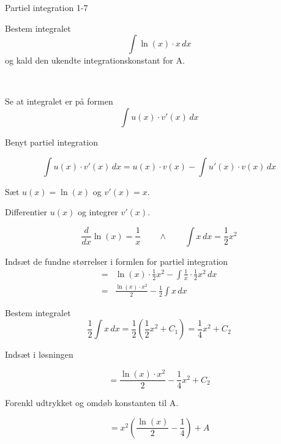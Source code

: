 \documentclass{article}
\begin{document}
\begin{exercise}{Partiel integration 1-7}
	
	
	Bestem integralet
	\[
	\int \ln(x) \cdot x \, dx
	\]
	og kald den ukendte integrationskonstant for A.
	
	 \\
	
	
	\hint
	
	Se at integralet er på formen
	\[
	\int u(x) \cdot v'(x) \, dx
	\]
	
	\hint
	
	Benyt partiel integration
	
	\hint
	\[
	\int u(x) \cdot v'(x)\, dx = u(x) \cdot v(x) - \int u'(x) \cdot v(x) \, dx
	\]
	\hint
	
	Sæt $u(x) = \ln(x)$ og $v'(x) = x$.
	
	
	\hint
	
	Differentier $u(x)$ og integrer $v'(x)$.
	
	\hint
	\[
	\frac{d}{dx}\ln(x) = \frac{1}{x} \qquad \wedge \qquad \int x \, dx = \frac{1 }{2}x^2
	\]
	
	\hint
	
	Indsæt de fundne størrelser i formlen for partiel integration
	\begin{align*}
	=& \ln(x) \cdot \frac{1}{2}x^2 - \int \frac{1}{x} \cdot \frac{1}{2}x^2 \, dx \\
	=& \frac{\ln(x) \cdot x^2}{2} - \frac{1}{2}\int x \, dx 
	\end{align*}
	
	\hint
	
	Bestem integralet
	\[
	\frac{1}{2}\int x \, dx = \frac{1}{2} \left( \frac{1}{2}x^2 + C_1 \right) = \frac{1}{4}x^2 + C_2
	\]
	
	\hint
	Indsæt i løsningen 
	
	\hint
	
	\[
	= \frac{\ln(x) \cdot x^2}{2} - \frac{1}{4}x^2 + C_2
	\]
	
	\hint
	
	Forenkl udtrykket og omdøb konstanten til A.
	
	\hint
	
	\[
	= x^2 \left( \frac{\ln(x)}{2} - \frac{1}{4}   \right) + A
	\]
	
	
\end{exercise}

\newpage
\end{document}
